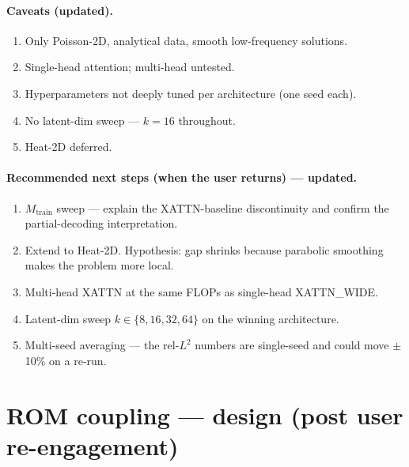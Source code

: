 \documentclass[11pt]{article}
\begin{document}
\paragraph{Caveats (updated).}
\begin{enumerate}
\item Only Poisson-2D, analytical data, smooth low-frequency solutions.
\item Single-head attention; multi-head untested.
\item Hyperparameters not deeply tuned per architecture (one seed each).
\item No latent-dim sweep --- $k=16$ throughout.
\item Heat-2D deferred.
\end{enumerate}

\paragraph{Recommended next steps (when the user returns) --- updated.}
\begin{enumerate}
\item $M_{\text{train}}$ sweep --- explain the XATTN-baseline discontinuity
      and confirm the partial-decoding interpretation.
\item Extend to Heat-2D. Hypothesis: gap shrinks because parabolic
      smoothing makes the problem more local.
\item Multi-head XATTN at the same FLOPs as single-head XATTN\_WIDE.
\item Latent-dim sweep $k \in \{8, 16, 32, 64\}$ on the winning
      architecture.
\item Multi-seed averaging --- the rel-$L^2$ numbers are single-seed and
      could move $\pm$10\% on a re-run.
\end{enumerate}

\section{ROM coupling --- design (post user re-engagement)}
\end{document}
